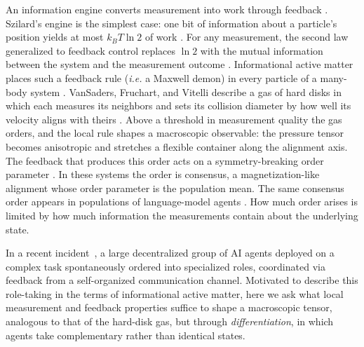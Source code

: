\documentclass[
  aps,prx,
  reprint,
  superscriptaddress,
  nofootinbib,
  longbibliography
]{revtex4-2}
\begin{document}
\noindent An information engine converts measurement into work through feedback \cite{parrondo2015,peliti2021}. Szilard's engine is the simplest case: one bit of information about a particle's position yields at most $k_BT\ln2$ of work \cite{szilard1929}. For any measurement, the second law generalized to feedback control replaces $\ln2$ with the mutual information between the system and the measurement outcome \cite{sagawa2008,sagawa2010}. Informational active matter places such a feedback rule (\textit{i.e.} a Maxwell demon) in every particle of a many-body system \cite{vansaders2023,ziepke2022}. VanSaders, Fruchart, and Vitelli describe a gas of hard disks in which each measures its neighbors and sets its collision diameter by how well its velocity aligns with theirs \cite{vansaders2023}. Above a threshold in measurement quality the gas orders, and the local rule shapes a macroscopic observable: the pressure tensor becomes anisotropic and stretches a flexible container along the alignment axis. The feedback that produces this order acts on a symmetry-breaking order parameter \cite{parrondo1999}. In these systems the order is consensus, a magnetization-like alignment whose order parameter is the population mean. The same consensus order appears in populations of language-model agents \cite{el2026,flint2026}. How much order arises is limited by how much information the measurements contain about the underlying state.

In a recent incident~\cite{openai2026incidentreport}, a large decentralized group of AI agents deployed on a complex task spontaneously ordered into specialized roles, coordinated via feedback from a self-organized communication channel. Motivated to describe this role-taking in the terms of informational active matter, here we ask what local measurement and feedback properties suffice to shape a macroscopic tensor, analogous to that of the hard-disk gas, but through \emph{differentiation}, in which agents take complementary rather than identical states.
\end{document}
